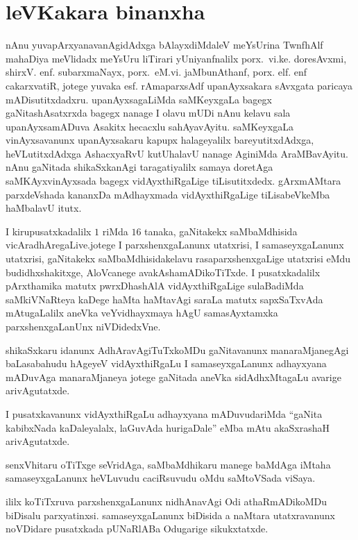  \chapter*{leVKakara binanxha}


\qquad nAnu yuvapArxyanavanAgidAdxga  bAlayxdiMdaleV meYsUrina TwnfhAlf mahaDiya meVlidadx meYsUru liTirari yUniyanfnalilx porx.~vi.ke. doresAvxmi, shirxV. enf. subarxmaNayx, porx.~eM.vi. jaMbunAthanf, porx. elf. enf cakarxvatiR, jotege yuvaka esf. rAmaparxsAdf upanAyxsakara sAvxgata paricaya mADisutitxdadxru.  upanAyxsagaLiMda saMKeyxgaLa bagegx gaNitashAsatxrxda bagegx nanage I olavu mUDi nAnu kelavu sala upanAyxsamADuva Asakitx hecacxlu sahAyavAyitu. saMKeyxgaLa vinAyxsavanunx upanAyxsakaru kapupx halageyalilx bareyutitxdAdxga, heVLutitxdAdxga AshacxyaRvU kutUhalavU nanage AginiMda AraMBavAyitu. nAnu gaNitada shikaSxkanAgi taragatiyalilx samaya doretAga saMKAyxvinAyxsada bagegx vidAyxthiRgaLige tiLisutitxdedx. gArxmAMtara parxdeVshada kananxDa mAdhayxmada vidAyxthiRgaLige tiLisabeVkeMba haMbalavU itutx.

 I kirupusatxkadalilx $1$ riMda $16$ tanaka, gaNitakekx saMbaMdhisida vicAradhAregaLive.\break jotege I parxshenxgaLanunx utatxrisi, I samaseyxgaLanunx utatxrisi, gaNitakekx saMbaMdhisida\break kelavu rasaparxshenxgaLige utatxrisi eMdu budidhxshakitxge, AloVcanege avakAshamADi\break koTiTxde. I pusatxkadalilx pArxthamika matutx pwrxDhashAlA vidAyxthiRgaLige sulaBadiMda saMkiVNaRteya kaDege haMta haMtavAgi saraLa matutx sapxSaTxvAda mAtugaLalilx aneVka veYvidhayxmaya hAgU samasAyxtamxka parxshenxgaLanUnx niVDidedxVne.

 shikaSxkaru idanunx AdhAravAgiTuTxkoMDu gaNitavanunx manaraMjanegAgi baLasa\-bahudu hAgeyeV vidAyxthiRgaLu I samaseyxgaLanunx adhayxyana mADuvAga manaraMjaneya jotege gaNitada aneVka sidAdhxMtagaLu avarige arivAgutatxde.

 I pusatxkavanunx vidAyxthiRgaLu adhayxyana mADuvudariMda ``gaNita kabibxNada kaDaleyalalx, laGuvAda hurigaDale'' eMba mAtu akaSxrashaH arivAgutatxde.

 senxVhitaru oTiTxge seVridAga, saMbaMdhikaru manege baMdAga iMtaha samaseyxgaLanunx heVLuvudu caciRsuvudu oMdu saMtoVSada viSaya.

  ililx koTiTxruva parxshenxgaLanunx nidhAnavAgi Odi athaRmADikoMDu biDisalu parxyatinxsi. samaseyxgaLanunx biDisida a naMtara utatxravanunx noVDidare pusatxkada pUNaRlABa Odugarige sikukxtatxde.


